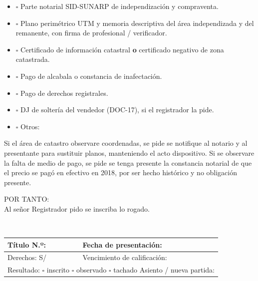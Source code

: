 \documentclass[12pt,a4paper]{article}
\begin{document}
\begin{itemize}[leftmargin=1.15cm]
\item $\square$ Parte notarial SID-SUNARP de independización y compraventa.
\item $\square$ Plano perimétrico UTM y memoria descriptiva del área independizada y del remanente, con firma de profesional / verificador.
\item $\square$ Certificado de información catastral \textbf{o} certificado negativo de zona catastrada.
\item $\square$ Pago de alcabala o constancia de inafectación.
\item $\square$ Pago de derechos registrales.
\item $\square$ DJ de soltería del vendedor (DOC-17), si el registrador la pide.
\item $\square$ Otros: \linea[10.5cm]
\end{itemize}

Si el área de catastro observare coordenadas, se pide se notifique al notario y al presentante para sustituir planos, manteniendo el acto dispositivo. Si se observare la falta de medio de pago, se pide se tenga presente la constancia notarial de que el precio se pagó en efectivo en 2018, por ser hecho histórico y no obligación presente.

\vspace{0.35em}
\noindent POR TANTO:\\
Al señor Registrador pido se inscriba lo rogado.

\LugarFecha

\noindent
{}
\hfill
{}

\vspace{0.8em}
\\
{\small\renewcommand{\arraystretch}{1.55}
\setlength{\tabcolsep}{5pt}
\noindent\begin{tabular}{|p{}|
p{}|}
\hline
Título N.º:\newline\hrulefill & Fecha de presentación:\newline\hrulefill \\
\hline
Derechos: S/\ \hrulefill & Vencimiento de calificación:\newline\hrulefill \\
\hline
\multicolumn{2}{|p{\dimexpr\linewidth-2\tabcolsep-2\arrayrulewidth}|}{%
Resultado: $\square$ inscrito \quad $\square$ observado \quad $\square$ tachado\newline
Asiento / nueva partida: \hrulefill}\\
\hline
\end{tabular}}
\end{document}
